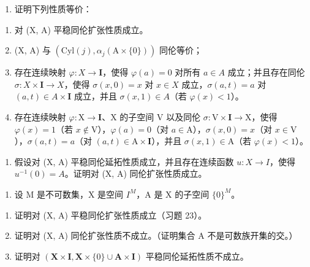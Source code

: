 \begin{enumerate}
\def\labelenumi{\alph{enumi})}
\tightlist
\item
  证明下列性质等价：
\end{enumerate}

\begin{enumerate}
\def\labelenumi{(\roman{enumi})}
\item
  对 (X, A) 平稳同伦扩张性质成立。
\item
  (X, A) 与 \((\mathrm{Cyl}(j), \alpha_{j}(\mathrm{A} \times \{0\}))\) 同伦等价；
\item
  存在连续映射 \(\varphi\colon X\to\mathbf{I}\)，使得 \(\varphi(a)=0\) 对所有 \(a\in A\) 成立；并且存在同伦 \(\sigma\colon X\times\mathbf{I}\to X\)，使得 \(\sigma(x,0)=x\) 对 \(x\in X\) 成立，\(\sigma(a,t)=a\) 对 \((a,t)\in A\times\mathbf{I}\) 成立，并且 \(\sigma(x,1)\in A\)（若 \(\varphi(x)<1\)）。
\item
  存在连续映射 \(\varphi\colon\mathrm{X}\to\mathbf{I}\)、X 的子空间 V 以及同伦 \(\sigma\colon\mathrm{V}\times\mathbf{I}\to\mathrm{X}\)，使得 \(\varphi(x)=1\)（若 \(x\notin\mathrm{V}\)），\(\varphi(a)=0\)（对 \(a\in\mathrm{A}\)），\(\sigma(x,0)=x\)（对 \(x\in\mathrm{V}\)），\(\sigma(a,t)=a\)（对 \((a,t)\in\mathrm{A}\times\mathbf{I}\)），并且 \(\sigma(x,1)\in\mathrm{A}\)（若 \(\varphi(x)<1\)）。
\end{enumerate}

\begin{enumerate}
\def\labelenumi{\alph{enumi})}
\setcounter{enumi}{1}
\tightlist
\item
  假设对 (X, A) 平稳同伦延拓性质成立，并且存在连续函数 \(u \colon X \to I\)，使得 \(u^{-1}(0) = A\)。证明对 (X, A) 同伦扩张性质成立。
\end{enumerate}

\begin{enumerate}
\def\labelenumi{\arabic{enumi})}
\setcounter{enumi}{23}
\tightlist
\item
  设 M 是不可数集，X 是空间 \(I^{M}\)，A 是 X 的子空间 \(\{0\}^{M}\)。
\end{enumerate}

\begin{enumerate}
\def\labelenumi{\alph{enumi})}
\item
  证明对 (X, A) 平稳同伦扩张性质成立（习题 23）。
\item
  证明对 (X, A) 同伦扩张性质不成立。（证明集合 A 不是可数族开集的交。）
\item
  证明对 \((\mathbf{X} \times \mathbf{I}, \mathbf{X} \times \{0\} \cup \mathbf{A} \times \mathbf{I})\) 平稳同伦延拓性质不成立。
\end{enumerate}


